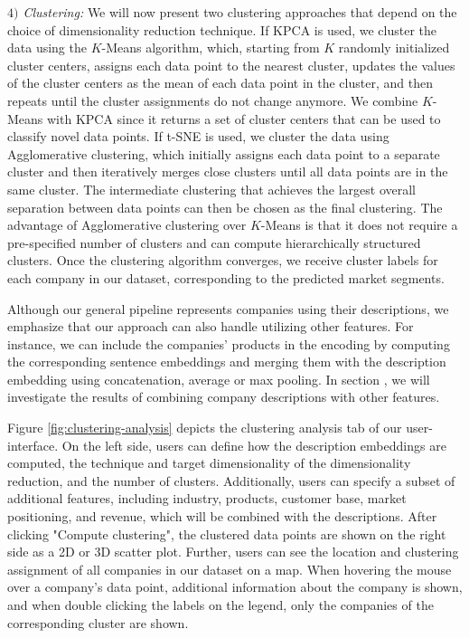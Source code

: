 \documentclass[conference]{IEEEtran}
\begin{document}
\textit{$4)$ Clustering:} We will now present two clustering approaches that depend on the choice of dimensionality reduction technique.
If KPCA is used, we cluster the data using the $K$-Means algorithm, which, starting from $K$ randomly initialized cluster centers, assigns each data point to the nearest cluster, updates the values of the cluster centers as the mean of each data point in the cluster, and then repeats until the cluster assignments do not change anymore. We combine $K$-Means with KPCA since it returns a set of cluster centers that can be used to classify novel data points. 
If t-SNE is used, we cluster the data using Agglomerative clustering, which initially assigns each data point to a separate cluster and then iteratively merges close clusters until all data points are in the same cluster. The intermediate clustering that achieves the largest overall separation between data points can then be chosen as the final clustering. The advantage of Agglomerative clustering over $K$-Means is that it does not require a pre-specified number of clusters and can compute hierarchically structured clusters.
Once the clustering algorithm converges, we receive cluster labels for each company in our dataset, corresponding to the predicted market segments.

Although our general pipeline represents companies using their descriptions, we emphasize that our approach can also handle utilizing other features. For instance, we can include the companies' products in the encoding by computing the corresponding sentence embeddings and merging them with the description embedding using concatenation, average or max pooling. In section \MakeUppercase{}, we will investigate the results of combining company descriptions with other features.

Figure \ref{fig:clustering-analysis} depicts the clustering analysis tab of our user-interface. On the left side, users can define how the description embeddings are computed, the technique and target dimensionality of the dimensionality reduction, and the number of clusters. Additionally, users can specify a subset of additional features, including industry, products, customer base, market positioning, and revenue, which will be combined with the descriptions. After clicking "Compute clustering", the clustered data points are shown on the right side as a 2D or 3D scatter plot. Further, users can see the location and clustering assignment of all companies in our dataset on a map. When hovering the mouse over a company's data point, additional information about the company is shown, and when double clicking the labels on the legend, only the companies of the corresponding cluster are shown.
\end{document}
